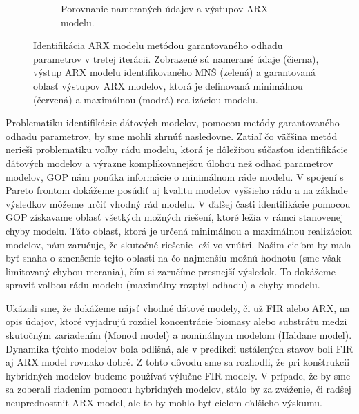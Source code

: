 \begin{figure}
\begin{subfigure}[b]{0.49\textwidth}
		\caption{Porovnanie nameraných údajov a výstupov ARX modelu.}
		\label{fig:ARX_sub_ident}
	\end{subfigure}
\caption{Identifikácia ARX modelu metódou garantovaného odhadu parametrov v tretej iterácii. Zobrazené sú namerané údaje (čierna), výstup ARX modelu identifikovaného MNŠ (zelená) a garantovaná oblasť výstupov ARX modelov, ktorá je definovaná minimálnou (červená) a maximálnou (modrá) realizáciou modelu.}
\label{fig:ARX_sub_identification}
\end{figure}

Problematiku identifikácie dátových modelov, pomocou metódy garantovaného odhadu parametrov, by sme mohli zhrnúť nasledovne. Zatiaľ čo väčšina metód nerieši problematiku voľby rádu modelu, ktorá je dôležitou súčasťou identifikácie dátových modelov a výrazne komplikovanejšou úlohou než odhad parametrov modelov, GOP nám ponúka informácie o minimálnom ráde modelu. V spojení s Pareto frontom dokážeme posúdiť aj kvalitu modelov vyššieho rádu a na základe výsledkov môžeme určiť vhodný rád modelu. V ďalšej časti identifikácie pomocou GOP získavame oblasť všetkých možných riešení, ktoré ležia v rámci stanovenej chyby modelu. Táto oblasť, ktorá je určená minimálnou a maximálnou realizáciou modelov, nám zaručuje, že skutočné riešenie leží vo vnútri. Našim cieľom by mala byť snaha o zmenšenie tejto oblasti na čo najmenšiu možnú hodnotu (sme však limitovaný chybou merania), čím si zaručíme presnejší výsledok. To dokážeme spraviť voľbou rádu modelu (maximálny rozptyl odhadu) a chyby modelu.

Ukázali sme, že dokážeme nájsť vhodné dátové modely, či už FIR alebo ARX, na opis údajov, ktoré vyjadrujú rozdiel koncentrácie biomasy alebo substrátu medzi skutočným zariadením (Monod model) a nominálnym modelom (Haldane model). Dynamika týchto modelov bola odlišná, ale v predikcii ustálených stavov boli FIR aj ARX model rovnako dobré. Z tohto dôvodu sme sa rozhodli, že pri konštrukcii hybridných modelov budeme používať výlučne FIR modely. V prípade, že by sme sa zoberali riadením pomocou hybridných modelov, stálo by za zváženie, či radšej neuprednostniť ARX model, ale to by mohlo byť cieľom ďalšieho výskumu.